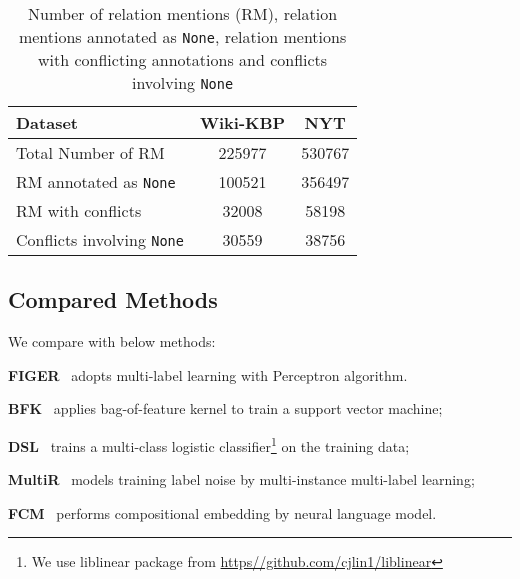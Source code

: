 

\begin{table}[t]
\centering
\begin{small}
\begin{tabular}{l|c|c}
\hline
\textbf{Dataset} & \textbf{Wiki-KBP} & \textbf{NYT} \\
\hline
Total Number of RM& 225977 & 530767\\
\hline
RM annotated as \texttt{None} & 100521  & 356497\\
\hline
RM with conflicts & 32008 & 58198\\
\hline
Conflicts involving \texttt{None} & 30559 & 38756 \\
\hline
\end{tabular}
\end{small}
\caption{\small Number of relation mentions (RM), relation mentions annotated as \texttt{None}, relation mentions with conflicting annotations and conflicts involving \texttt{None}}
\label{tab:data_conflicts}
\end{table}

\subsection{Compared Methods} 
We compare \our with below methods: 

\noindent
\textbf{\small FIGER}~\cite{ling2012fine} adopts multi-label learning with Perceptron algorithm.

\noindent
\textbf{\small BFK}~\cite{bunescu2005subsequence} applies bag-of-feature kernel to train a support vector machine;

\noindent
\textbf{\small DSL}~\cite{mintz2009distant} trains a multi-class logistic classifier\footnote{We use liblinear package from \url{https//github.com/cjlin1/liblinear}} on the training data;

\noindent
\textbf{\small MultiR}~\cite{hoffmann2011knowledge} models training label noise by multi-instance multi-label learning;

\noindent
\textbf{\small FCM}~\cite{gormley2015improved} performs compositional embedding by neural language model.

